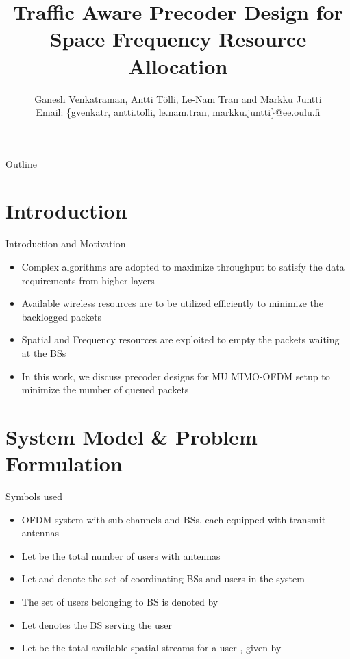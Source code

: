 \documentclass[9pt]{beamer}
\title{Traffic Aware Precoder Design for Space Frequency Resource Allocation}
\author{{Ganesh Venkatraman, Antti T\"{o}lli, Le-Nam Tran and Markku Juntti\eqn{^\dagger}} \\ \scriptsize{Email: \{gvenkatr, antti.tolli, le.nam.tran, markku.juntti\}@ee.oulu.fi}}
\begin{document}
\AtBeginSection{\frame{\sectionpage}}

\begin{frame}
    \titlepage
\end{frame}

\begin{frame}{Outline} \scriptsize
    \tableofcontents
\end{frame}

  

\section{Introduction}

\begin{frame}{Introduction and Motivation}
\begin{itemize}
\item Complex algorithms are adopted to maximize throughput to satisfy the data requirements from higher layers
\item Available wireless resources are to be utilized efficiently to minimize the backlogged packets 
\item Spatial and Frequency resources are exploited to empty the packets waiting at the \acp{BS}
\item In this work, we discuss precoder designs for \acl{MU} \acs{MIMO}-\acs{OFDM} setup to minimize the number of queued packets 
\end{itemize}
\end{frame}

\section{System Model \& Problem Formulation}

\begin{frame}{Symbols used}
\begin{itemize}
\item \acs{OFDM} system with  sub-channels and  \acp{BS}, each equipped with  transmit antennas
\item Let  be the total number of users with  antennas
\item Let  and  denote the set of coordinating \acp{BS} and users in the system
\item The set of users belonging to \acs{BS}  is denoted by 
\item Let  denotes the \ac{BS} serving the user 
\item Let  be the total available spatial streams for a user , given by 
\end{itemize}
\end{frame}
\end{document}
